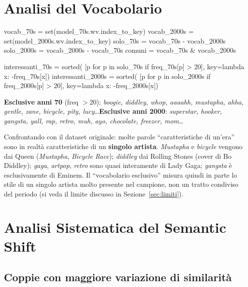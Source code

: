 \documentclass[12pt,a4paper]{article}
\begin{document}
\section{Analisi del Vocabolario}

\begin{pylisting}[title={Confronto dei vocabolari e parole caratteristiche}]
vocab_70s   = set(model_70s.wv.index_to_key)
vocab_2000s = set(model_2000s.wv.index_to_key)
solo_70s   = vocab_70s - vocab_2000s
solo_2000s = vocab_2000s - vocab_70s
comuni     = vocab_70s & vocab_2000s

interessanti_70s = sorted(
    [p for p in solo_70s if freq_70s[p] > 20], key=lambda x: -freq_70s[x])
interessanti_2000s = sorted(
    [p for p in solo_2000s if freq_2000s[p] > 20], key=lambda x: -freq_2000s[x])
\end{pylisting}

\textbf{Esclusive anni 70} (freq $>20$): \textit{boogie, diddley, whop, aaaahh, mustapha, ahha, gentle, zane, bicycle, pity, lucy}\ldots \textbf{Esclusive anni 2000}: \textit{superstar, hooker, gangsta, yall, rap, retro, muh, ayo, chocolate, freezer, mom}\ldots

Confrontando con il dataset originale: molte parole ``caratteristiche di un'era'' sono in realt\`a caratteristiche di un \textbf{singolo artista}. \textit{Mustapha} e \textit{bicycle} vengono dai Queen (\textit{Mustapha}, \textit{Bicycle Race}); \textit{diddley} dai Rolling Stones (cover di Bo Diddley); \textit{gaga}, \textit{artpop}, \textit{retro} sono quasi interamente di Lady Gaga; \textit{gangsta} \`e esclusivamente di Eminem. Il ``vocabolario esclusivo'' misura quindi in parte lo stile di un singolo artista molto presente nel campione, non un tratto condiviso del periodo (si veda il limite discusso in Sezione~\ref{sec:limiti}).

\section{Analisi Sistematica del Semantic Shift}

\subsection{Coppie con maggiore variazione di similarit\`a}
\label{sec:shift-sistematico}
\end{document}
